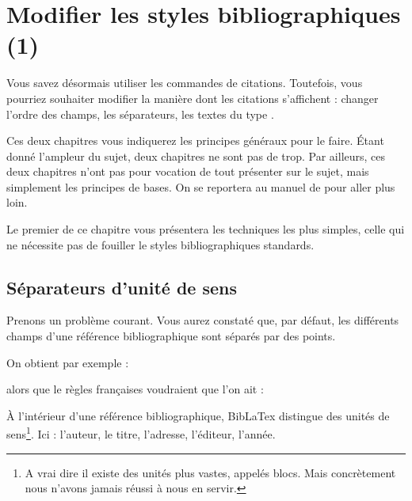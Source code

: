 \chapter{Modifier les styles bibliographiques (1)}

	\begin{prealable}
	
	Vous savez désormais utiliser les commandes de citations. Toutefois, vous pourriez souhaiter modifier la manière dont les citations s'affichent :  changer l'ordre des champs, les séparateurs, les textes du type .
	
	Ces deux chapitres vous indiquerez les principes généraux pour le faire. Étant donné l'ampleur du sujet, deux chapitres ne sont pas de trop. Par ailleurs, ces deux chapitres n'ont pas pour vocation de tout présenter sur le sujet, mais simplement les principes de bases. On se reportera au manuel de  pour aller plus loin.
	
	Le premier de ce chapitre vous présentera les techniques les plus simples, celle qui ne nécessite pas de fouiller le styles bibliographiques standards. 
	
	
	\end{prealable}
	
	
	\section{Séparateurs d'unité de sens}
	
Prenons un problème courant. Vous aurez constaté que, par défaut, les différents champs d'une référence bibliographique sont séparés par des points.

	On obtient par exemple :
	
	\renewcommand{\newunitpunct}[0]{\adddot\addspace} 
	
	\begin{quotation}
	\cite{Urner1952}
	\end{quotation}
	
	alors que le règles françaises voudraient que l'on ait :
	
	\renewcommand{\newunitpunct}[0]{\addcomma\addspace}
	
	\begin{quotation}
	\cite{Urner1952}
	\end{quotation}
	
À l'intérieur d'une référence bibliographique, BibLaTex distingue des unités de sens\footnote{A vrai dire il existe des unités plus vastes, appelés blocs. Mais concrètement nous n'avons jamais réussi à nous en servir.}. Ici : l'auteur, le titre, l'adresse, l'éditeur, l'année. 

